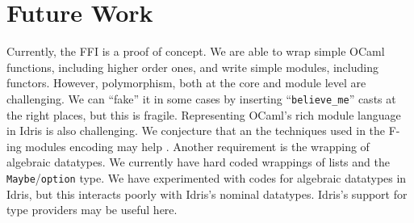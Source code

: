 \documentclass[a4paper,10pt,twocolumn]{article}
\begin{document}
\section{Future Work}

Currently, the FFI is a proof of concept. We are able to wrap simple
OCaml functions, including higher order ones, and write simple
modules, including functors. However, polymorphism, both at the core
and module level are challenging. We can ``fake'' it in some cases by
inserting ``\texttt{believe\_me}'' casts at the right places, but this
is fragile. Representing OCaml's rich module language in Idris is also
challenging. We conjecture that an the techniques used in the F-ing
modules encoding may help \cite{f-modules}. Another requirement is the
wrapping of algebraic datatypes. We currently have hard coded
wrappings of lists and the \texttt{Maybe}/\texttt{option} type. We
have experimented with codes for algebraic datatypes in Idris, but
this interacts poorly with Idris's nominal datatypes. Idris's support
for type providers \cite{type-providers} may be useful here.


\end{document}
